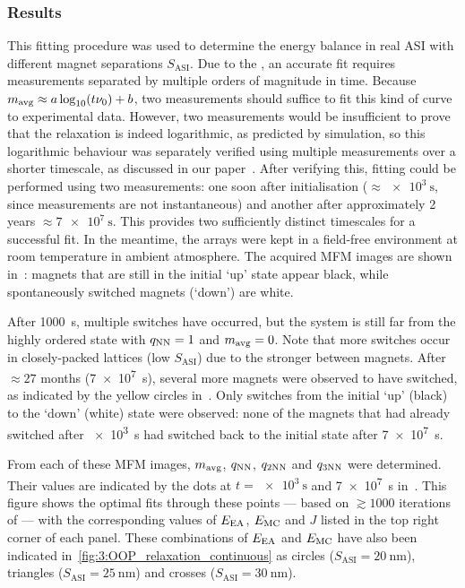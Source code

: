 \subsubsection{Results}
This fitting procedure was used to determine the energy balance in real ASI with different magnet separations $S_\mathrm{ASI}$.
Due to the , an accurate fit requires measurements separated by multiple orders of magnitude in time.
Because $\mavg \approx a \log_{10}(t \nu_0) + b$, two measurements should suffice to fit this kind of curve to experimental data.
However, two measurements would be insufficient to prove that the relaxation is indeed logarithmic, as predicted by simulation, so this logarithmic behaviour was separately verified using multiple measurements over a shorter timescale, as discussed in our paper~\cite[Supp. 5.4]{KUR-24}.
After verifying this, fitting could be performed using two measurements: one soon after initialisation ($\approx \SI{e3}{\second}$, since  measurements are not instantaneous) and another after approximately 2 years $\approx \SI{7e7}{\second}$.
This provides two sufficiently distinct timescales for a successful fit.
In the meantime, the arrays were kept in a field-free environment at room temperature in ambient atmosphere.
The acquired MFM images are shown in~: magnets that are still in the initial `up' state appear black, while spontaneously switched magnets (`down') are white. \par
After \SI{1000}{\second}, multiple switches have occurred, but the system is still far from the highly ordered state with $\qNN=1$ and $\mavg=0$.
Note that more switches occur in closely-packed lattices (low $S_\mathrm{ASI}$) due to the stronger  between magnets.
After $\approx 27$ months (\SI{7e7}{\second}), several more magnets were observed to have switched, as indicated by the yellow circles in~.
Only switches from the initial `up' (black) to the `down' (white) state were observed: none of the magnets that had already switched after \SI{e3}{\second} had switched back to the initial state after \SI{7e7}{\second}. \par
From each of these MFM images, $\mavg$, $\qNN$, $\qNN[2]$ and $\qNN[3]$ were determined.
Their values are indicated by the dots at $t=\SI{e3}{\second}$ and \SI{7e7}{\second} in~.
This figure shows the optimal fits through these points --- based on $\gtrsim 1000$ iterations of  --- with the corresponding values of $\EEA$, $\EMC$ and $J$ listed in the top right corner of each panel.
These combinations of $\EEA$ and $\EMC$ have also been indicated in~\cref{fig:3:OOP_relaxation_continuous} as circles ($S_\mathrm{ASI}=\SI{20}{\nano\metre}$), triangles ($S_\mathrm{ASI}=\SI{25}{\nano\metre}$) and crosses ($S_\mathrm{ASI}=\SI{30}{\nano\metre}$).

